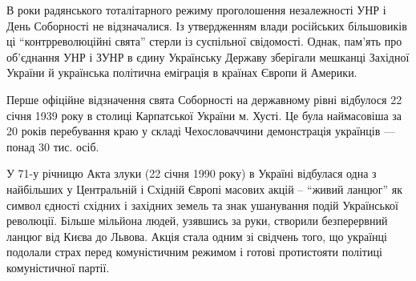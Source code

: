 В роки радянського тоталітарного режиму проголошення незалежності УНР і День
Соборності не відзначалися. Із утвердженням влади російських більшовиків ці
\enquote{контрреволюційні свята} стерли із суспільної свідомості. Однак, пам'ять про
об'єднання УНР і ЗУНР в єдину Українську Державу зберігали мешканці Західної
України й українська політична еміграція в країнах Європи й Америки.

Перше офіційне відзначення свята Соборності на державному рівні відбулося 22
січня 1939 року в столиці Карпатської України м. Хусті. Це була наймасовіша за
20 років перебування краю у складі Чехословаччини демонстрація українців —
понад 30 тис. осіб.

У 71-у річницю Акта злуки (22 січня 1990 року) в Україні відбулася одна з
найбільших у Центральній і Східній Європі масових акцій – \enquote{живий ланцюг} як
символ єдності східних і західних земель та знак ушанування подій Української
революції. Більше мільйона людей, узявшись за руки, створили безперервний
ланцюг від Києва до Львова. Акція стала одним зі свідчень того, що українці
подолали страх перед комуністичним режимом і готові протистояти політиці
комуністичної партії.
